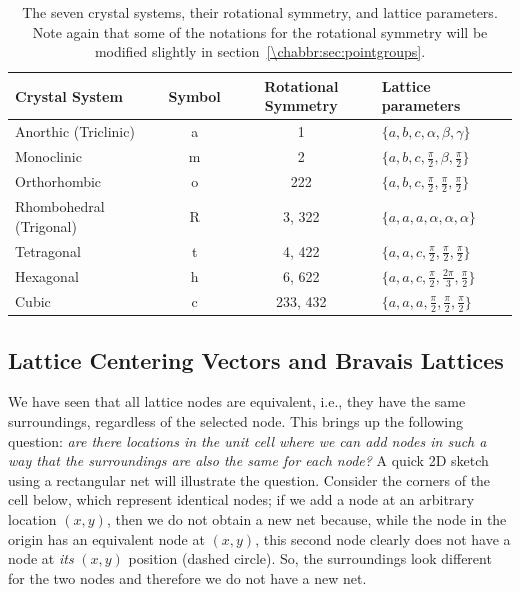 \begin{table}[th]
\centering\leavevmode
\renewcommand{\arraystretch}{1.2}
\begin{tabular}{|l|c|c|l|}
\hline
Crystal System &Symbol& Rotational Symmetry & Lattice parameters\\
\hline\hline
Anorthic (Triclinic) 	&a&  1  		& $\{a,b,c,\alpha,\beta,\gamma\}$ \\
Monoclinic 		&m&	2	& $\{a,b,c,\frac{\pi}{2},\beta,\frac{\pi}{2}\}$\\
Orthorhombic 		&o&	222	& $\{a,b,c,\frac{\pi}{2},\frac{\pi}{2},\frac{\pi}{2}\}$\\
Rhombohedral (Trigonal) 	&R&	3, 322	& $\{a,a,a,\alpha,\alpha,\alpha\}$\\
Tetragonal 		&t&	4, 422	& $\{a,a,c,\frac{\pi}{2},\frac{\pi}{2},\frac{\pi}{2}\}$\\
Hexagonal 		&h&	6, 622	& $\{a,a,c,\frac{\pi}{2},\frac{2\pi}{3},\frac{\pi}{2}\}$\\
Cubic 			&c&	233, 432	& $\{a,a,a,\frac{\pi}{2},\frac{\pi}{2},\frac{\pi}{2}\}$\\
\hline
\end{tabular}
\caption{\label{\chabbr:tb:crystalsystems}The seven crystal systems, their rotational symmetry, and lattice parameters. Note again that some of the notations for the rotational symmetry will be modified slightly in section~\protect\ref{\chabbr:sec:pointgroups}.}
\end{table}


\subsection{Lattice Centering Vectors and Bravais Lattices}\label{\chabbr:ssec:Bravais}
We have seen that all lattice nodes are equivalent, i.e., they have the same surroundings, regardless of the selected node.  This brings up the following question: \textit{are there locations in the unit cell where we can add nodes in such a way that the surroundings are also the same for each node?}  A quick 2D sketch using a rectangular net will illustrate the question. Consider the corners of the cell below, which represent identical nodes; if we add a node at an arbitrary location $(x,y)$, then we do not obtain a new net because, while the node in the origin has an equivalent node at $(x,y)$, this second node clearly does not have a node at \textit{its} $(x,y)$ position (dashed circle). So, the surroundings look different for the two nodes and therefore we do not have a new net.

